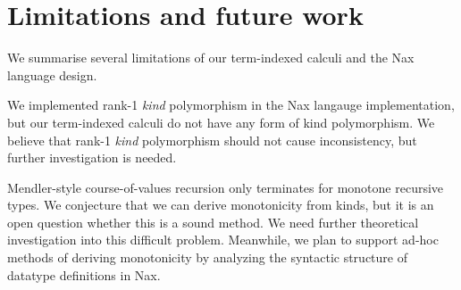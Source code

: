 
\section{Limitations and future work}\label{sec:concl:fw}
We summarise several limitations of our term-indexed calculi and
the Nax language design.

We implemented rank-1 {\it kind} polymorphism in the Nax langauge implementation,
but our term-indexed calculi do not have any form of kind polymorphism.
We believe that rank-1 {\it kind} polymorphism should not cause inconsistency, but
further investigation is needed.

Mendler-style course-of-values recursion only terminates for monotone
recursive types. We conjecture that we can derive monotonicity from kinds,
but it is an open question whether this is a sound method. We need further
theoretical investigation into this difficult problem.
Meanwhile, we plan to support ad-hoc methods of deriving monotonicity
by analyzing the syntactic structure of datatype definitions in Nax.

